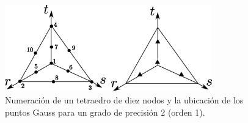 \begin{figure}[htb!]
	\centering
	\includegraphics[width=0.8\textwidth]{fig/T10numbering.eps}
	\caption{Numeración de un tetraedro de diez nodos y la ubicación de los puntos Gauss para un grado de precisión 2 (orden 1).}
	\label{fig:T10numbering}
\end{figure}


%




